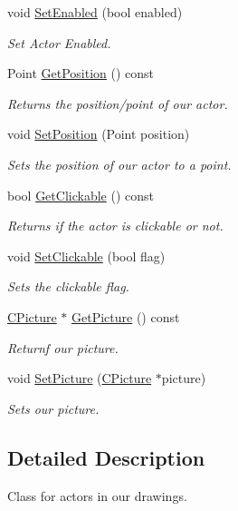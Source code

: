 \begin{DoxyCompactItemize}
void \hyperlink{class_c_actor_a6f9009e9753b07a00266cac01af2fdad}{Set\+Enabled} (bool enabled)
\begin{DoxyCompactList}\small\item\em Set Actor Enabled. \end{DoxyCompactList}\item 
Point \hyperlink{class_c_actor_a0e87214ef13b3e00e3869b262d6a106c}{Get\+Position} () const 
\begin{DoxyCompactList}\small\item\em Returns the position/point of our actor. \end{DoxyCompactList}\item 
void \hyperlink{class_c_actor_a565fa3f4ffbf8ca360d791623a9491de}{Set\+Position} (Point position)
\begin{DoxyCompactList}\small\item\em Sets the position of our actor to a point. \end{DoxyCompactList}\item 
bool \hyperlink{class_c_actor_a54c9188974b6313d8ffcbac17e343263}{Get\+Clickable} () const 
\begin{DoxyCompactList}\small\item\em Returns if the actor is clickable or not. \end{DoxyCompactList}\item 
void \hyperlink{class_c_actor_a14ba1cc069ad2710b4db5d536b152918}{Set\+Clickable} (bool flag)
\begin{DoxyCompactList}\small\item\em Sets the clickable flag. \end{DoxyCompactList}\item 
\hyperlink{class_c_picture}{C\+Picture} $\ast$ \hyperlink{class_c_actor_adba8556f52253d533e71f5c707f11436}{Get\+Picture} () const 
\begin{DoxyCompactList}\small\item\em Returnf our picture. \end{DoxyCompactList}\item 
void \hyperlink{class_c_actor_ac4b2315b3476d4fdc97ba961fdcaa444}{Set\+Picture} (\hyperlink{class_c_picture}{C\+Picture} $\ast$picture)
\begin{DoxyCompactList}\small\item\em Sets our picture. \end{DoxyCompactList}\end{DoxyCompactItemize}


\subsection{Detailed Description}
Class for actors in our drawings. 

